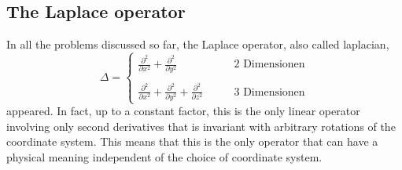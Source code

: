 \subsection{The Laplace operator\label{beispiele:laplaceoperator}}
In all the problems discussed so far, the Laplace operator,
also called laplacian,
\[
\Delta
=
\begin{cases}
\displaystyle
\frac{\partial^2}{\partial x^2}
+\frac{\partial^2}{\partial y^2}&\qquad\text{2 Dimensionen}\\
\\
\displaystyle
\frac{\partial^2}{\partial x^2}
+\frac{\partial^2}{\partial y^2}
+\frac{\partial^2}{\partial z^2}&\qquad\text{3 Dimensionen}
\end{cases}
\]
appeared.
In fact, up to a constant factor, this is the only linear operator involving
only second derivatives that is invariant with arbitrary rotations of the
coordinate system.
This means that this is the only operator that can have a physical
meaning independent of the choice of coordinate system.

